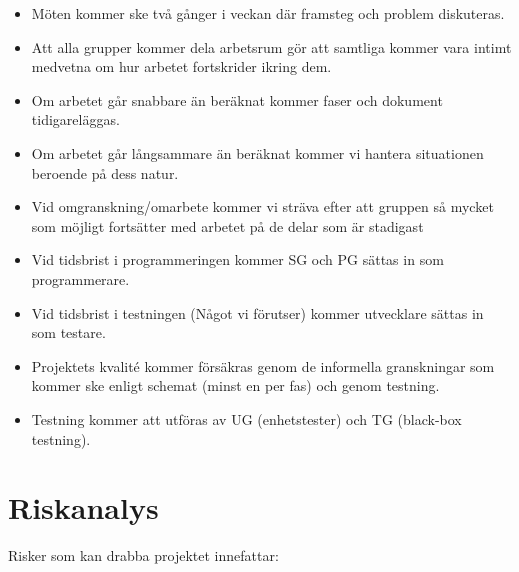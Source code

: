 \documentclass[paper=a4, fontsize=11pt,twoside]{article}
\begin{document}
\begin{itemize}
\item Möten kommer ske två gånger i veckan där framsteg och problem diskuteras.
\item Att alla grupper kommer dela arbetsrum gör att samtliga kommer vara intimt medvetna om hur arbetet fortskrider ikring dem.
\item Om arbetet går snabbare än beräknat kommer faser och dokument tidigareläggas.
\item Om arbetet går långsammare än beräknat kommer vi hantera situationen beroende på dess natur.
\item Vid omgranskning/omarbete kommer vi sträva efter att gruppen så mycket som möjligt fortsätter med arbetet på de delar som är stadigast
\item Vid tidsbrist i programmeringen kommer SG och PG sättas in som programmerare.
\item Vid tidsbrist i testningen (Något vi förutser) kommer utvecklare sättas in som testare.
\item Projektets kvalité kommer försäkras genom de informella granskningar som kommer ske enligt schemat (minst en per fas) och genom testning.
\item Testning kommer att utföras av UG (enhetstester) och TG (black-box testning).
\end{itemize}

\section{Riskanalys}

Risker som kan drabba projektet innefattar: 
\end{document}
